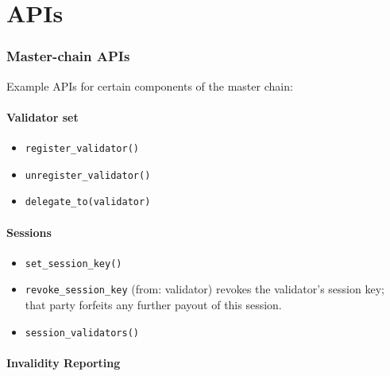 \section{APIs}\label{apis}

\subsubsection{Master-chain APIs}\label{master-chain-apis}

 Example APIs for certain components of the master chain:

\paragraph{Validator set}\label{validator-set}

\begin{itemize}
\tightlist
\item
  \texttt{register\_validator()}
\item
  \texttt{unregister\_validator()}
\item
  \texttt{delegate\_to(validator)}
\end{itemize}

\paragraph{Sessions}\label{sessions}

\begin{itemize}
\tightlist
\item
  \texttt{set\_session\_key()}
\item
  \texttt{revoke\_session\_key} (from: validator) revokes the
   validator's session key; that party forfeits any further payout of   this session.
\item
  \texttt{session\_validators()}
\end{itemize}

\paragraph{Invalidity Reporting}\label{invalidity-reporting}


